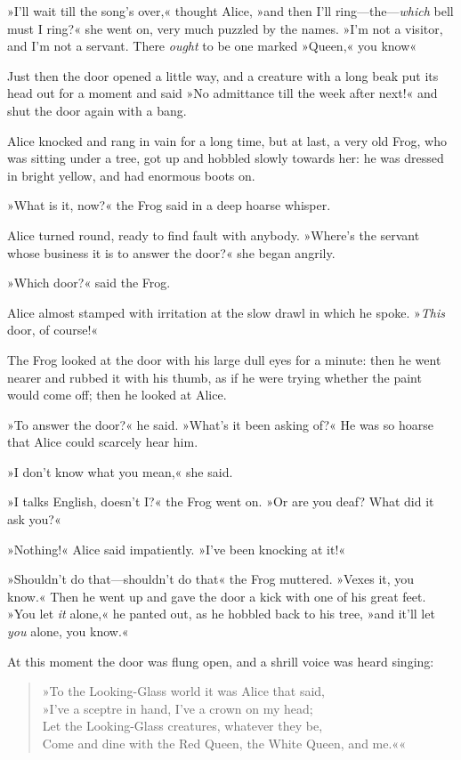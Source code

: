 \label{white9}
\label{black9}


»I'll wait till the song's over,« thought Alice, »and then I'll ring—the—\textit{which} bell must I ring?« she went on, very much puzzled by the names. »I'm not a visitor, and I'm not a servant. There \textit{ought} to be one marked »Queen,« you know\longdash«

Just then the door opened a little way, and a creature with a long beak put its head out for a moment and said »No admittance till the week after next!« and shut the door again with a bang.

Alice knocked and rang in vain for a long time, but at last, a very old Frog, who was sitting under a tree, got up and hobbled slowly towards her: he was dressed in bright yellow, and had enormous boots on.

»What is it, now?« the Frog said in a deep hoarse whisper.

Alice turned round, ready to find fault with anybody. »Where's the servant whose business it is to answer the door?« she began angrily.

»Which door?« said the Frog.

Alice almost stamped with irritation at the slow drawl in which he spoke. »\textit{This} door, of course!«

The Frog looked at the door with his large dull eyes for a minute: then he went nearer and rubbed it with his thumb, as if he were trying whether the paint would come off; then he looked at Alice.

»To answer the door?« he said. »What's it been asking of?« He was so hoarse that Alice could scarcely hear him.

»I don't know what you mean,« she said.

»I talks English, doesn't I?« the Frog went on. »Or are you deaf? What did it ask you?«

»Nothing!« Alice said impatiently. »I've been knocking at it!«

»Shouldn't do that—shouldn't do that\longdash« the Frog muttered. »Vexes it, you know.« Then he went up and gave the door a kick with one of his great feet. »You let \textit{it} alone,« he panted out, as he hobbled back to his tree, »and it'll let \textit{you} alone, you know.«

At this moment the door was flung open, and a shrill voice was heard singing:

\begin{verse}
»To the Looking-Glass world it was Alice that said,\\
\vin »I've a sceptre in hand, I've a crown on my head;\\
Let the Looking-Glass creatures, whatever they be,\\
\vin Come and dine with the Red Queen, the White Queen, and me.««
\end{verse}

